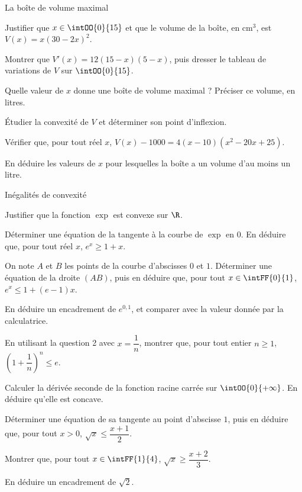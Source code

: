 \begin{exercice}[3]{La boîte de volume maximal}
\begin{questions}
  \item Justifier que $x\in\intOO{0}{15}$ et que le volume de la boîte, en cm$^{3}$, est $V(x)=x(30-2x)^{2}$.
  \item Montrer que $V'(x)=12(15-x)(5-x)$, puis dresser le tableau de variations de $V$ sur $\intOO{0}{15}$.
  \item Quelle valeur de $x$ donne une boîte de volume maximal ? Préciser ce volume, en litres.
  \item Étudier la convexité de $V$ et déterminer son point d'inflexion.
  \item \begin{questions}
      \item Vérifier que, pour tout réel $x$, $V(x)-1000=4(x-10)\left(x^{2}-20x+25\right)$.
      \item En déduire les valeurs de $x$ pour lesquelles la boîte a un volume d'au moins un litre.
    \end{questions}
\end{questions}
\end{exercice}

\begin{exercice}[3]{Inégalités de convexité}
\begin{questions}
  \item Justifier que la fonction $\exp$ est convexe sur $\R$.
  \item Déterminer une équation de la tangente à la courbe de $\exp$ en $0$. En déduire que, pour tout réel $x$,
    $e^{x}\geq1+x$.
  \item On note $A$ et $B$ les points de la courbe d'abscisses $0$ et $1$. Déterminer une équation de la droite $(AB)$,
    puis en déduire que, pour tout $x\in\intFF{0}{1}$, $e^{x}\leq1+(e-1)x$.
  \item En déduire un encadrement de $e^{0,1}$, et comparer avec la valeur donnée par la calculatrice.
  \item En utilisant la question 2 avec $x=\dfrac1n$, montrer que, pour tout entier $n\geq1$,
    $\left(1+\dfrac1n\right)^{n}\leq e$.
\end{questions}
\begin{questions}[resume]
  \item Calculer la dérivée seconde de la fonction racine carrée sur $\intOO{0}{+\infty}$. En déduire qu'elle est concave.
  \item Déterminer une équation de sa tangente au point d'abscisse $1$, puis en déduire que, pour tout $x>0$,
    $\sqrt{x}\leq\dfrac{x+1}{2}$.
  \item Montrer que, pour tout $x\in\intFF{1}{4}$, $\sqrt{x}\geq\dfrac{x+2}{3}$.
  \item En déduire un encadrement de $\sqrt2$.
\end{questions}
\end{exercice}
